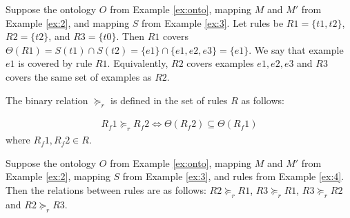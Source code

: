 \begin{example} \label{ex:4}
	Suppose the ontology $O$ from Example \ref{ex:onto}, mapping $M$ and $M'$ from Example \ref{ex:2}, and mapping $S$ from Example \ref{ex:3}. Let rules be $R1=\{t1, t2\}$, $R2=\{t2\}$, and $R3=\{t0\}$. Then $R1$ covers $\Theta(R1) = S(t1) \cap S(t2) = \{e1\} \cap \{e1, e2, e3\} = \{e1\}$. We say that example $e1$ is covered by rule $R1$. Equivalently, $R2$ covers examples $e1, e2, e3$ and $R3$ covers the same set of examples as $R2$.
\end{example}


The binary relation $\succeq_{r}$ is defined in the set of rules $R$ as follows:

\begin{eqnarray} \label{eq:forder}
R_{f}1 \succeq_{r}  R_{f}2 \iff  \Theta(R_{f}2) \subseteq \Theta(R_{f}1)
\end{eqnarray}
where  $R_{f}1, R_{f}2 \in R$.

\begin{example} \label{ex:5}
	Suppose the ontology $O$ from Example \ref{ex:onto}, mapping $M$ and $M'$ from Example \ref{ex:2}, mapping $S$ from Example \ref{ex:3}, and rules from Example \ref{ex:4}. Then the relations between rules are as follows: $R2 \succeq_{r} R1$, $R3 \succeq_{r} R1$, $R3 \succeq_{r} R2$ and $R2 \succeq_{r} R3$. 
\end{example}


